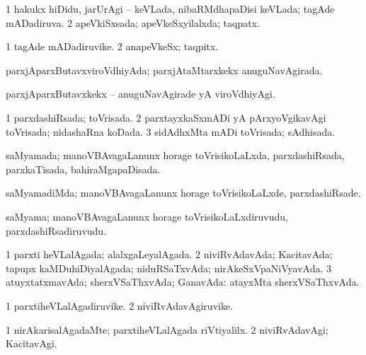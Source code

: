 \bentry
{} 
\gl{\gu}
\expl{}
\bmng
\bnum
\num{1} hakukx hiDidu, jarUrAgi -- keVLada, nibaRMdhapaDisi keVLada; tagAde mADadiruva. 
\num{2} apeVkiSxsada; apeVkeSxyilalxda; taqpatx. 
\enum
\emng
\eentry

\bentry
{} 
\gl{\nA}
\expl{}
\bmng
\bnum
\num{1} tagAde mADadiruvike. 
\num{2} anapeVkeSx; taqpitx. 
\enum
\emng
\eentry

\bentry
{} 
\gl{\gu}
\expl{}
\bmng
 parxjAparxButavxviroVdhiyAda; parxjAtaMtarxkekx anuguNavAgirada. 
\emng
\eentry

\bentry
{} 
\gl{\kirxvi}
\expl{}
\bmng
 parxjAparxButavxkekx -- anuguNavAgirade yA viroVdhiyAgi. 
\emng
\eentry

\bentry
{} 
\gl{\gu}
\expl{}
\bmng
\bnum
\num{1} parxdashiRsada; toVrisada. 
\num{2} parxtayxkaSxmADi yA pArxyoVgikavAgi toVrisada; nidashaRna koDada. 
\num{3} sidAdhxMta mADi toVrisada; sAdhisada. 
\enum
\emng
\eentry

\bentry
{} 
\gl{\gu}
\expl{}
\bmng
 saMyamada; manoVBAvagaLanunx horage toVrisikoLaLxda, parxdashiRsada, parxkaTisada, bahiraMgapaDisada. 
\emng
\eentry

\bentry
{} 
\gl{\kirxvi}
\expl{}
\bmng
 saMyamadiMda; manoVBAvagaLanunx horage toVrisikoLaLxde, parxdashiRsade. 
\emng
\eentry

\bentry
{} 
\gl{\nA}
\expl{}
\bmng
 saMyama; manoVBAvagaLanunx horage toVrisikoLaLxdiruvudu, parxdashiRsadiruvudu. 
\emng
\eentry

\bentry
{} 
\gl{\gu}
\expl{}
\bmng
\bnum
\num{1} parxti heVLalAgada; alalxgaLeyalAgada. 
\num{2} niviRvAdavAda; KacitavAda; tapupx kaMDuhiDiyalAgada; niduRSaTxvAda; nirAkeSxVpaNiVyavAda. 
\num{3} atuyxtatxmavAda; sherxVSaThxvAda; GanavAda:  atayxMta sherxVSaThxvAda. 
\enum
\emng
\eentry

\bentry
{} 
\gl{\nA}
\expl{}
\bmng
\bnum
\num{1} parxtiheVLalAgadiruvike. 
\num{2} niviRvAdavAgiruvike. 
\enum
\emng
\eentry

\bentry
{} 
\gl{\kirxvi}
\expl{}
\bmng
\bnum
\num{1} nirAkarisalAgadaMte; parxtiheVLalAgada riVtiyalilx. 
\num{2} niviRvAdavAgi; KacitavAgi. 
\enum
\emng
\eentry


